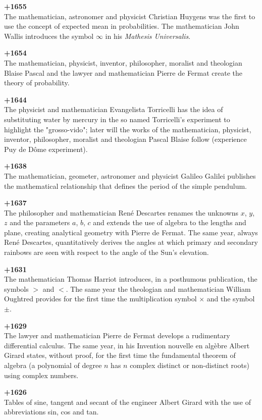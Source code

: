 \textbf{+1655}\\
The mathematician, astronomer and physicist Christian Huygens was the first to use the concept of expected mean in probabilities. The mathematician John Wallis introduces the symbol $\infty$ in his \textit{Mathesis Universalis}.

\textbf{+1654}\\
The mathematician, physicist, inventor, philosopher, moralist and theologian Blaise Pascal and the lawyer and mathematician Pierre de Fermat create the theory of probability.

\textbf{+1644}\\
The physicist and mathematician Evangelista Torricelli has the idea of substituting water by mercury in the so named Torricelli's experiment to highlight the "grosso-vido"; later will the works of the mathematician, physicist, inventor, philosopher, moralist and theologian Pascal Blaise follow (experience Puy de Dôme experiment).

\textbf{+1638}\\
The mathematician, geometer, astronomer and physicist Galileo Galilei publishes the mathematical relationship that defines the period of the simple pendulum.

\textbf{+1637}\\
The philosopher and mathematician René Descartes renames the unknowns $x$, $y$, $z$ and the parameters $a$, $b$, $c$ and extends the use of algebra to the lengths and plane, creating analytical geometry with Pierre de Fermat. The same year, always René Descartes, quantitatively derives the angles at which primary and secondary rainbows are seen with respect to the angle of the Sun's elevation.

\textbf{+1631}\\
The mathematician Thomas Harriot introduces, in a posthumous publication, the symbols $>$ and $<$. The same year the theologian and mathematician William Oughtred provides for the first time the multiplication symbol $\times$ and the symbol $\pm$.

\textbf{+1629}\\
The lawyer and mathematician Pierre de Fermat develops a rudimentary differential calculus. The same year, in his Invention nouvelle en algèbre Albert Girard states, without proof, for the first time the fundamental theorem of algebra (a polynomial of degree $n$ has $n$ complex distinct or non-distinct roots) using complex numbers.

\textbf{+1626}\\
Tables of sine, tangent and secant of the engineer Albert Girard with the use of abbreviations sin, cos and tan.

